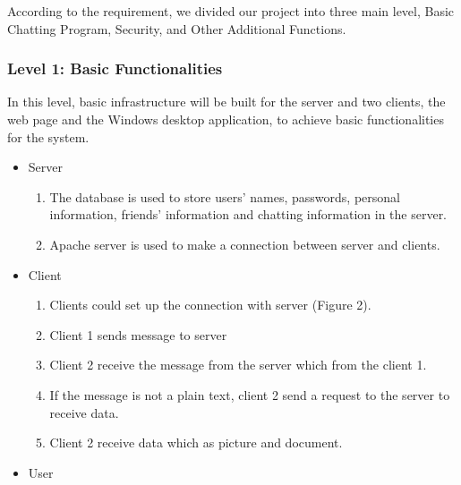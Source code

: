 \documentclass[a4paper,11pt]{article}
\begin{document}
According to the requirement, we divided our project into three main level, Basic Chatting Program, Security, and Other Additional Functions. 
\subsubsection{Level 1: Basic Functionalities}
In this level, basic infrastructure will be built for the server and two clients, the web page and the Windows desktop application, to achieve basic functionalities for the system. 

\begin{itemize}




\item Server
\begin{enumerate}
\item The database is used to store users' names, passwords, personal information, friends' information and chatting information in the server.
\item Apache server is used to make a connection between server and clients.
\end{enumerate}








\item Client
\begin{enumerate}
\item Clients could set up the connection with server (Figure 2).
\item Client 1 sends message to server
\item Client 2 receive the message from the server which from the client 1.
\item If the message is not a plain text, client 2 send a request to the server to receive data.
\item Client 2 receive data which as picture and document.
\end {enumerate}
\item User


\end{itemize}
\end{document}
